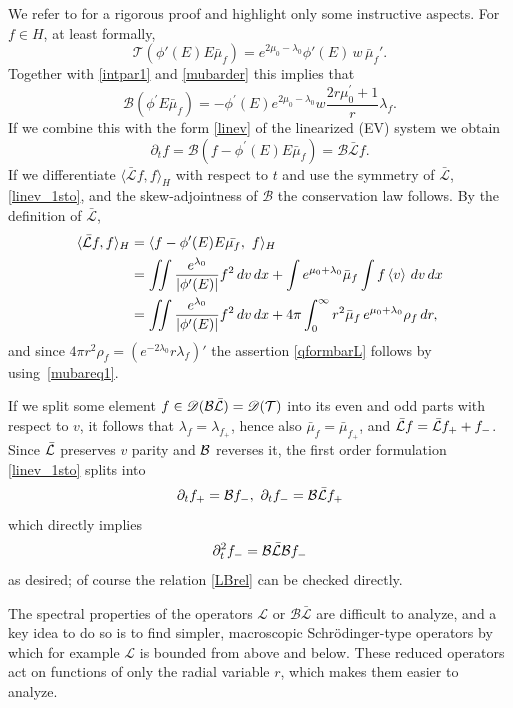 \documentclass[11pt]{article}
\begin{document}
%
%
We refer to \cite[Lemma~4.20]{HaLinRe} for a rigorous proof
and highlight only some instructive aspects.
For $f\in H$, at least formally,
\[ 
\mathcal T (\phi'(E) E \bar\mu_f)
= e^{2 \mu_0-\lambda_0} \phi'(E)\, w\, \bar\mu_f'.
\]
Together with \eqref{intpar1} and \eqref{mubarder} this implies that
\[
\mathcal{B}\left(
\phi^{\prime }E \bar{\mu}_f\right)=
-\phi^{\prime }(E)e^{2\mu_0-\lambda_0}w
\frac{2r\mu_0^{\prime }+1}{r}\lambda_f.
\]
If we combine this with the form \eqref{linev} of the linearized (EV) system
we obtain
\[
\partial _{t}f=\mathcal{B} \left( f-\phi^{\prime}(E)
E \bar{\mu}_f\right) = \mathcal{B} \bar{\mathcal L} f.
\]
If we differentiate $\langle\bar{\mathcal{L}} f,f\rangle_H$
with respect to $t$
and use the symmetry of $\bar{\mathcal L}$, \eqref{linev_1sto},
and the skew-adjointness of $\mathcal B$ the conservation law follows.
By the definition of $\bar{\mathcal L}$,
\begin{align*}
  \langle\bar{\mathcal{L}} f,f\rangle_H & =
  \langle f-\phi^{\prime }(E) E \bar{\mu_f},\ f\rangle_H \\
  & = \iint \frac{e^{\lambda_0 }}{|\phi'(E)|} f^{2}\,dv\,dx
  + \int e^{\mu_0+\lambda_0} \bar\mu_f \int f\left\langle v\right\rangle\,dv\,dx \\
  & =  \iint \frac{e^{\lambda_0}}{|\phi'(E)|} f^{2}\,dv\,dx
  + 4\pi \int_0^\infty r^2\bar\mu_f\,  e^{\mu_0+\lambda_0}\rho_f\,dr,
\end{align*}
and since $4\pi r^2 \rho_f = \left(e^{-2\lambda_0}r\lambda_f\right)'$
the assertion \eqref{qformbarL} follows by using~\eqref{mubareq1}.

If we split some element $f\in {\mathscr D}({\cal B} \bar{{\cal L}})={\mathscr D}({\cal T})$
into its even and odd parts with respect to $v$, it follows that
$\lambda_f =\lambda_{f_+}$, hence also $\bar\mu_f=\bar\mu_{f_+}$,
and $\bar{{\cal L}} f = \bar{{\cal L}} f_+ + f_-$. Since $\bar{{\cal L}}$ preserves $v$ parity
and ${\cal B}$ reverses it, the first order formulation \eqref{linev_1sto}
splits into
\[
\partial_t f_+ = {\cal B} f_-,\ \partial_t f_- = {\cal B} \bar{{\cal L}} f_+
\]
which directly implies
\[
\partial_t^2 f_- = {\cal B} \bar{{\cal L}} {\cal B} f_-
\]
as desired; of course the relation \eqref{LBrel} can be checked directly.


The spectral properties of the operators $\mathcal L$ or
$\mathcal B \bar{\mathcal L}$ are difficult to analyze,
and a key idea to do so is to find simpler,
macroscopic Schr\"odinger-type operators
by which for example $\mathcal L$
is bounded from above and below.
These reduced operators act on functions of only the radial variable $r$, 
which makes them easier to analyze.
\end{document}
